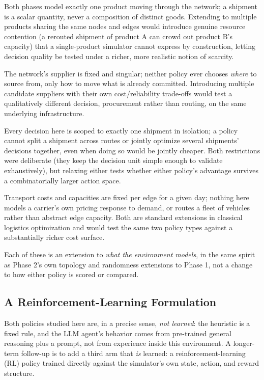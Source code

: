 \documentclass[10pt,twocolumn]{article}
\begin{document}
\begin{description}[leftmargin=1.2em,style=unboxed]
\item[Multiple products.] Both phases model exactly one product moving through the network; a shipment is a scalar quantity, never a composition of distinct goods. Extending to multiple products sharing the same nodes and edges would introduce genuine resource contention (a rerouted shipment of product A can crowd out product B's capacity) that a single-product simulator cannot express by construction, letting decision quality be tested under a richer, more realistic notion of scarcity.
\item[Supplier selection and procurement.] The network's supplier is fixed and singular; neither policy ever chooses \emph{where} to source from, only how to move what is already committed. Introducing multiple candidate suppliers with their own cost/reliability trade-offs would test a qualitatively different decision, procurement rather than routing, on the same underlying infrastructure.
\item[Shipment splitting and joint multi-shipment optimization.] Every decision here is scoped to exactly one shipment in isolation; a policy cannot split a shipment across routes or jointly optimize several shipments' decisions together, even when doing so would be jointly cheaper. Both restrictions were deliberate (they keep the decision unit simple enough to validate exhaustively), but relaxing either tests whether either policy's advantage survives a combinatorially larger action space.
\item[Dynamic pricing and fleet-level routing.] Transport costs and capacities are fixed per edge for a given day; nothing here models a carrier's own pricing response to demand, or routes a fleet of vehicles rather than abstract edge capacity. Both are standard extensions in classical logistics optimization and would test the same two policy types against a substantially richer cost surface.
\end{description}

Each of these is an extension to \emph{what the environment models}, in the same spirit as Phase 2's own topology and randomness extensions to Phase 1, not a change to how either policy is scored or compared.

\subsection{A Reinforcement-Learning Formulation}
\label{sec:rl}
Both policies studied here are, in a precise sense, \emph{not learned}: the heuristic is a fixed rule, and the LLM agent's behavior comes from pre-trained general reasoning plus a prompt, not from experience inside this environment. A longer-term follow-up is to add a third arm that \emph{is} learned: a reinforcement-learning (RL) policy trained directly against the simulator's own state, action, and reward structure.
\end{document}
